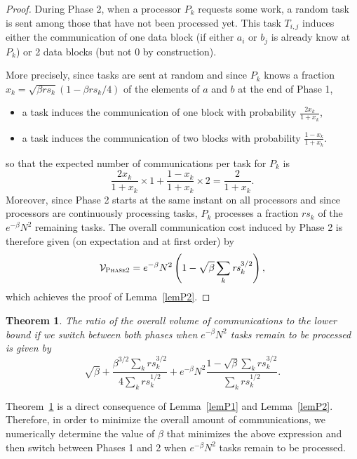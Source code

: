 \documentclass[a4paper,10pt]{article}
\newtheorem{theorem}{Theorem}
\begin{document}
\begin{proof} 


  During Phase 2, when a processor $P_k$ requests some work, a random
  task is sent among those that have not been processed yet. This task
  $T_{i,j}$ induces either the communication of one data block (if
  either $a_i$ or $b_j$ is already know at $P_k$) or 2 data blocks
  (but not 0 by construction).

  More precisely, since tasks are sent at random and since $P_k$ knows
  a fraction $x_k = \sqrt{\beta \mathit{rs}_k} (1 -\beta
  \mathit{rs}_k/4) $ of the elements of $a$ and $b$ at the end of
  Phase 1,
  \begin{itemize}
  \item a task induces the communication of one block with probability
    $\frac{2 x_k}{1+x_k}$,
  \item a task induces the communication of two blocks with
    probability $\frac{1- x_k}{1+x_k}$.
  \end{itemize}
  so that the expected number of communications per task for $P_k$
  is
  $$ \frac{2 x_k}{1+x_k} \times 1 + \frac{1- x_k}{1+x_k} \times 2
  =\frac{2}{1+x_k}.$$
 Moreover, since Phase 2 starts at the same
  instant on all processors and since processors are continuously
  processing tasks, $P_k$ processes a fraction $\mathit{rs}_k$ of the
  $e^{-\beta} N^2$ remaining tasks. The overall communication cost
  induced by Phase 2 is therefore given (on expectation and at first
  order) by
  $$ {\cal V}_{\textsc{Phase2}} =  e^{-\beta} N^2 \left( 1-\sqrt{\beta}  \sum_k \mathit{rs}_k^{3/2}\right),$$
  which achieves the proof of Lemma~\ref{lemP2}.
\end{proof}

\begin{theorem}
\label{mainthouter}
The ratio of the overall volume of communications to the lower bound if we switch between both phases when $e^{-\beta} N^2 $ tasks remain to be processed is given by 
$$\sqrt{\beta}  + \frac{\beta^{3/2} \sum_k \mathit{rs}_k^{3/2}}{ 4 \sum_k \mathit{rs}_k^{1/2}}  + e^{-\beta} N^2 \frac{1-\sqrt{\beta}  \sum_k \mathit{rs}_k^{3/2}}{\sum_k \mathit{rs}_k^{1/2}}.$$

\end{theorem}

Theorem~\ref{mainthouter} is a direct consequence of Lemma~\ref{lemP1}
and Lemma~\ref{lemP2}. Therefore, in order to minimize the overall
amount of communications, we numerically determine the value of
$\beta$ that minimizes the above expression and then switch between
Phases 1 and 2 when $e^{-\beta} N^2 $ tasks remain to be processed.
\end{document}
